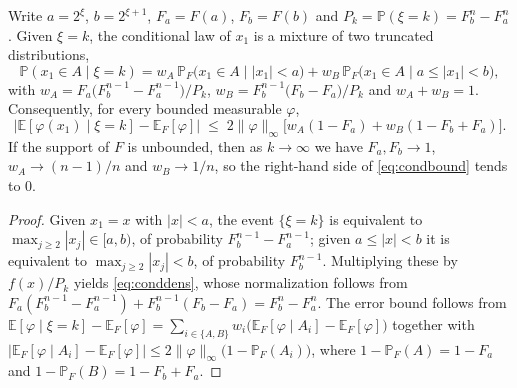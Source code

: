 \documentclass[twocolumn,review,hidelinks,oneeqnum,onetabnum,onefignum,onethmnum]{siamart251216}
\begin{document}
\begin{lemma}
\label{lem:cond}
Write $a=2^{\xi}$, $b=2^{\xi+1}$, $F_a=F(a)$, $F_b=F(b)$ and
$P_k=\mathbb P(\xi=k)=F_b^n-F_a^n$. Given $\xi=k$, the conditional law of $x_1$ is
a mixture of two truncated distributions,
\begin{equation}
\mathbb P(x_1\in A\mid\xi=k)
=w_A\,\mathbb P_F\bigl(x_1\in A\mid |x_1|<a\bigr)
+w_B\,\mathbb P_F\bigl(x_1\in A\mid a\le|x_1|<b\bigr),
\label{eq:conddens}
\end{equation}
with
$w_A=F_a\bigl(F_b^{n-1}-F_a^{n-1}\bigr)/P_k$,
$w_B=F_b^{n-1}\bigl(F_b-F_a\bigr)/P_k$ and $w_A+w_B=1$. Consequently, for every
bounded measurable $\varphi$,
\begin{equation}
\bigl|\mathbb E[\varphi(x_1)\mid\xi=k]-\mathbb E_F[\varphi]\bigr|
\;\le\;2\|\varphi\|_\infty\bigl[w_A(1-F_a)+w_B(1-F_b+F_a)\bigr].
\label{eq:condbound}
\end{equation}
If the support of $F$ is unbounded, then as $k\to\infty$ we have $F_a,F_b\to1$,
$w_A\to(n-1)/n$ and $w_B\to1/n$, so the right-hand side of \cref{eq:condbound}
tends to $0$.
\end{lemma}

\begin{proof}
Given $x_1=x$ with $|x|<a$, the event $\{\xi=k\}$ is equivalent to
$\max_{j\ge2}|x_j|\in[a,b)$, of probability $F_b^{n-1}-F_a^{n-1}$; given
$a\le|x|<b$ it is equivalent to $\max_{j\ge2}|x_j|<b$, of probability
$F_b^{n-1}$. Multiplying these by $f(x)/P_k$ yields \cref{eq:conddens}, whose
normalization follows from
$F_a(F_b^{n-1}-F_a^{n-1})+F_b^{n-1}(F_b-F_a)=F_b^n-F_a^n$. The error bound follows
from
$\mathbb E[\varphi\mid\xi=k]-\mathbb E_F[\varphi]=\sum_{i\in\{A,B\}}w_i\bigl(\mathbb E_F[\varphi\mid A_i]-\mathbb E_F[\varphi]\bigr)$
together with
$|\mathbb E_F[\varphi\mid A_i]-\mathbb E_F[\varphi]|\le2\|\varphi\|_\infty\bigl(1-\mathbb P_F(A_i)\bigr)$,
where $1-\mathbb P_F(A)=1-F_a$ and $1-\mathbb P_F(B)=1-F_b+F_a$.
\end{proof}
\end{document}
